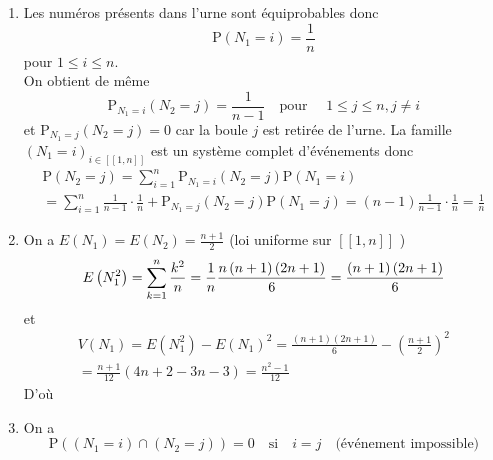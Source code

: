 \begin{enumerate}
\begin{enumerate}
\item Les num\'eros pr\'esents dans l'urne sont \'equiprobables donc $$\mathrm{P}
\left( N_{1}=i\right) =\frac{1}{n}$$ pour $1\leqslant i\leqslant n$.\\
On obtient de même
\begin{displaymath}
\mathrm{P}_{N_{1}=i}\left( N_{2}=j\right) =\frac{1}{n-1}\quad \text{pour } \quad 1\leqslant j\leqslant n,j\neq i  
\end{displaymath}
et $\mathrm{P}_{N_{1}=j}\left( N_{2}=j\right) =0$ car la boule $j$ est retir\'ee de l'urne.\newline
La famille $\left( N_{1}=i\right) _{i\in \left[\!\left[ 1,n\right]\!\right] }$ est un syst\`eme complet d'\'ev\'enements donc
\begin{multline*}
\mathrm{P}\left( N_{2}=j\right) 
 = \sum_{i=1}^{n}\mathrm{P}_{N_{1}=i}\left(N_{2}=j\right) \mathrm{P}\left( N_{1}=i\right) \\
 = \sum_{i=1}^n\frac{1}{n-1}\cdot \frac{1}{n}+\mathrm{P}_{N_{1}=j}\left( N_{2}=j\right) \mathrm{P}\left( N_{1}=j\right) 
 = \left( n-1\right) \frac{1}{n-1}\cdot \frac{1}{n}=\frac{1}{n}
\end{multline*}




\item On a $E\left( N_{1}\right) =E\left( N_{2}\right) =\frac{n+1}{2}$ (loi uniforme sur $\left[ \!\left[ 1,n\right]\!\right] $ )
\begin{displaymath}
E\left( N_{1}^{2}\right) = \sum_{k=1}^{n}\frac{k^{2}}{n}
 = \frac{1}{n}\frac{n\left( n+1\right) \left( 2n+1\right) }{6} \\
 = \frac{\left( n+1\right) \left( 2n+1\right) }{6}
\end{displaymath}
et 
\begin{multline*}
V\left( N_{1}\right) 
 = E\left( N_{1}^{2}\right) -E\left( N_{1}\right) ^{2}
 = \frac{\left( n+1\right) \left( 2n+1\right) }{6}-\left( \frac{n+1}{2}\right) ^{2} \\
 = \frac{n+1}{12}\left( 4n+2-3n-3\right) 
 = \frac{n^{2}-1}{12}
\end{multline*}
D'où 

\item On a $$\mathrm{P}\left( (N_{1}=i)\cap(N_{2}=j)\right) =0 \quad\text{si}\quad i=j\quad \text{(\'ev\'enement impossible)}$$


\end{enumerate}
\end{enumerate}
